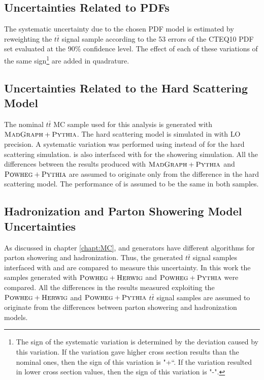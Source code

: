 \subsection{Uncertainties Related to PDFs}

The systematic uncertainty due to the chosen PDF model is estimated by reweighting the $t\bar{t}$ signal sample according to the 
53 errors of the CTEQ10 PDF set evaluated at the 90\% confidence level\cite{Lai:2010vv}. The effect of each of these variations
of the same sign\footnote{The sign of the systematic variation is determined by the deviation caused by this
variation. If the variation gave higher cross section results than the nominal ones, then the sign of this variation is "+``. 
If the variation resulted in lower cross section values, then the sign of this variation is "-".} are added in quadrature.


\subsection{Uncertainties Related to the Hard Scattering Model}

The nominal $t\bar{t}$ MC sample used for this analysis is generated with $\textsc{MadGraph}+\textsc{Pythia}$. The hard scattering model is simulated
in \MG with LO precision. A systematic variation was performed using \Powheg instead of \MG for the hard scattering simulation.
\Powheg is also interfaced with \PYTHIA for the showering simulation. All the differences between the results produced with $\textsc{MadGraph}+\textsc{Pythia}$
and $\textsc{Powheg}+\textsc{Pythia}$ are assumed to originate only from the difference in the hard scattering model. The performance of \PYTHIA is assumed 
to be the same in both samples.

\subsection{Hadronization and Parton Showering Model Uncertainties}

As discussed in chapter \ref{chapt:MC}, \PYTHIA and \HERWIG generators have different algorithms for parton showering and hadronization.
Thus, the generated $t\bar{t}$ signal samples interfaced with \PYTHIA and \HERWIG are compared to measure this uncertainty. In this work
the samples generated with $\textsc{Powheg}+\textsc{Herwig}$ and $\textsc{Powheg}+\textsc{Pythia}$ were compared. All the differences in the results measured exploiting the
$\textsc{Powheg}+\textsc{Herwig}$ and $\textsc{Powheg}+\textsc{Pythia}$ $t\bar{t}$ signal samples are assumed to originate from the differences between parton showering
and hadronization models.

